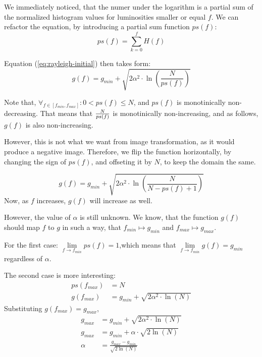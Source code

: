 \documentclass[12pt]{article}
\theoremstyle{definition}
\begin{document}
We immediately noticed, that the numer under the logarithm is a partial sum of the normalized histogram values for luminosities smaller or equal $f$.
We can refactor the equation, by introducing a partial sum function $ps(f)$:
\begin{equation}
    ps(f) = \sum\limits_{k=0}^f H(f)
\end{equation}

Equation (\ref{eq:rayleigh-initial}) then takes form:
\begin{equation}
    g(f) = g_{min} + \sqrt{
        2 \alpha^2 \cdot \ln
        \left(
            \frac{N}{ps(f)}
        \right)}
\end{equation}

Note that,
\(
    \forall_{f \in [f_{min},f_{max}]} : 0 < ps(f) \leq N
\), and $ps(f)$ is monotinically non-decreasing.
That means that $N \over ps(f)$ is monotinically non-increasing, and as follows, $g(f)$ is also non-increasing.

However, this is not what we want from image transformation, as it would produce a negative image.
Therefore, we flip the function horizontally, by changing the sign of $ps(f)$, and offseting it by $N$, to keep the domain the same.

\begin{equation}
    g(f) = g_{min} + \sqrt{
        2 \alpha^2 \cdot \ln
        \left(
            \frac{N}{N - ps(f) + 1}
        \right)}
    \label{eq:rayleigh-corrected}
\end{equation}
Now, as $f$ increases, $g(f)$ will increase as well.

However, the value of $\alpha$ is still unknown. 
We know, that the function $g(f)$ should map $f$ to $g$ in such a way, that 
$f_{min} \mapsto g_{min}$ and $f_{max} \mapsto g_{max}$.

For the first case:
\(
    \lim\limits_{f \to f_{min}} ps(f) = 1 
\),which means that
\(
    \lim\limits_{f \to f_{min}} g(f) = g_{min}
\) regardless of $\alpha$.

The second case is more interesting:
\begin{align*}
    ps(f_{max}) &= N \\[1ex]
    g(f_{max}) &= g_{min} + \sqrt{
        2 \alpha^2 \cdot \ln(N)
    }
\end{align*}
Substituting $g(f_{max}) = g_{max}$,
\begin{align}
    g_{max} &= g_{min} + \sqrt{
        2 \alpha^2 \cdot \ln(N)
    }\nonumber\\[1ex]
    g_{max} &= g_{min} + \alpha \cdot \sqrt{2\ln(N)} \nonumber\\[1ex]
    \alpha &= \frac{g_{max} - g_{min}}{\sqrt{2\ln(N)}} \label{eq:rayleigh-alpha}
\end{align}
\end{document}
